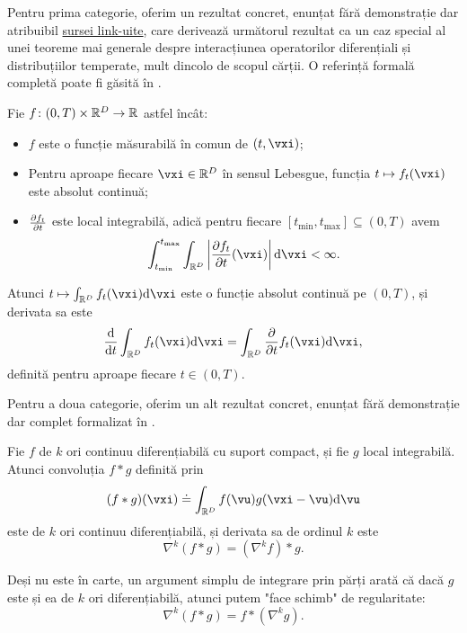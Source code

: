 \documentclass[../../book-main_ro.tex]{subfiles}
\begin{document}
Pentru prima categorie, oferim un rezultat concret, enunțat fără demonstrație dar atribuibil \href{https://planetmath.org/differentiationundertheintegralsign}{sursei link-uite}, care derivează următorul rezultat ca un caz special al unei teoreme mai generale despre interacțiunea operatorilor diferențiali și distribuțiilor temperate, mult dincolo de scopul cărții. O referință formală completă poate fi găsită în \cite{jones1982theory}.
\begin{proposition}\label{prop:dutis}
    Fie \(f \colon (0, T) \times \mathbb{R}^{D} \to \mathbb{R}\) astfel încât:
    \begin{itemize}
        \item \(f\) este o funcție măsurabilă în comun de \((t, \vxi)\);
        \item Pentru aproape fiecare \(\vxi \in \R^{D}\) în sensul Lebesgue, funcția \(t \mapsto f_{t}(\vxi)\) este absolut continuă;
        \item \(\pdv{f_{t}}{t}\) este local integrabilă, adică pentru fiecare \([t_{\min}, t_{\max}] \subseteq (0, T)\) avem
        \begin{equation}
            \int_{t_{\min}}^{t_{\max}}\int_{\R^{D}}\abs*{\pdv{f_{t}}{t}(\vxi)}\odif{\vxi} < \infty.
        \end{equation}
    \end{itemize}
    Atunci \(t \mapsto \int_{\R^{D}}f_{t}(\vxi)\odif{\vxi}\) este o funcție absolut continuă pe \((0, T)\), și derivata sa este
    \begin{equation}
        \odv*{\int_{\R^{D}}f_{t}(\vxi)\odif{\vxi}}{t} = \int_{\R^{D}}\pdv*{f_{t}}{t}(\vxi)\odif{\vxi},
    \end{equation}
    definită pentru aproape fiecare \(t \in (0, T)\).
\end{proposition}

Pentru a doua categorie, oferim un alt rezultat concret, enunțat fără demonstrație dar complet formalizat în \cite{brezis2011functional}.
\begin{proposition}\label{prop:diff_convolution}
    Fie \(f\) de \(k\) ori continuu diferențiabilă cu suport compact, și fie \(g\) local integrabilă. Atunci convoluția \(f * g\) definită prin
    \begin{equation}
        (f * g)(\vxi) \doteq \int_{\R^{D}}f(\vu)g(\vxi - \vu)\odif{\vu}
    \end{equation}
    este de \(k\) ori continuu diferențiabilă, și derivata sa de ordinul \(k\) este
    \begin{equation}
        \nabla^{k}(f * g) =(\nabla^{k}f) * g. 
    \end{equation}
\end{proposition}
Deși nu este în carte, un argument simplu de integrare prin părți arată că dacă \(g\) este și ea de \(k\) ori diferențiabilă, atunci putem "face schimb" de regularitate:
\begin{equation}
    \nabla^{k}(f * g) = f * (\nabla^{k} g).
\end{equation}
\end{document}
